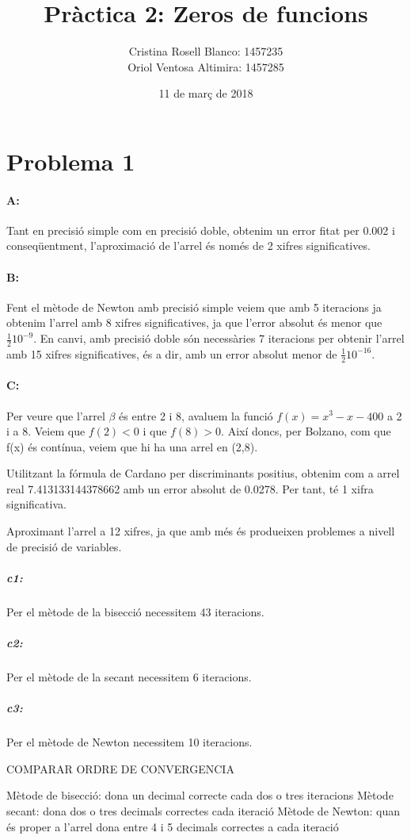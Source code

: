 \documentclass{article}
\title{Pràctica 2: Zeros de funcions}
\author{Cristina Rosell Blanco: 1457235  \\ Oriol Ventosa Altimira: 1457285}
\date{11 de març de 2018}
\begin{document}
	\maketitle
	
	\newpage

	\section{Problema 1}
	\paragraph{A:} Tant en precisió simple com en precisió doble, obtenim un error fitat per 0.002 i conseqüentment, l'aproximació de l'arrel és només de 2 xifres significatives.
	
	\paragraph{B:} Fent el mètode de Newton amb precisió simple veiem que amb 5 iteracions ja obtenim l'arrel amb 8 xifres significatives, ja que l'error absolut és menor que $\frac{1}{2}10^{-9}$. En canvi, amb precisió doble són necessàries 7 iteracions per obtenir l'arrel amb 15 xifres significatives, és a dir, amb un error absolut menor de $\frac{1}{2}10^{-16}$.
	
	\paragraph{C:} Per veure que l'arrel $\beta$ és entre 2 i 8, avaluem la funció $f(x)=x^3-x-400$ a 2 i a 8. Veiem que $f(2)<0$ i que $f(8)>0$. Així doncs, per Bolzano, com que f(x) és contínua, veiem que hi ha una arrel en (2,8). 
	
	Utilitzant la fórmula de Cardano per discriminants positius, obtenim com a arrel real 7.413133144378662 amb un error absolut de 0.0278. Per tant, té 1 xifra significativa.
	
	Aproximant l'arrel a 12 xifres, ja que amb més és produeixen problemes a nivell de precisió de variables.
	
	\subparagraph{c1:} Per el mètode de la bisecció necessitem 43 iteracions.
	\subparagraph{c2:} Per el mètode de la secant necessitem 6 iteracions.
	\subparagraph{c3:} Per el mètode de Newton necessitem 10 iteracions.
	
	COMPARAR ORDRE DE CONVERGENCIA 
	
	Mètode de bisecció: dona un decimal correcte cada dos o tres iteracions
	Mètode secant: dona dos o tres decimals correctes cada iteració
	Mètode de Newton: quan és proper a l'arrel dona entre 4 i 5 decimals correctes a cada iteració
	
\end{document}
